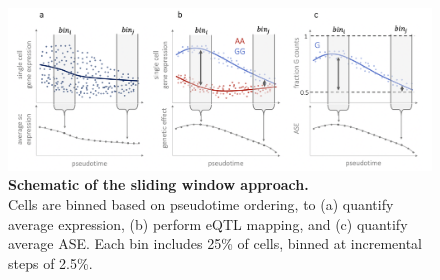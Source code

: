 \begin{figure}[h]
\centering
\includegraphics[width=15.5cm]{Chapter4/Fig/endodiff_running_average.png}
\caption[Schematic of the sliding window approach]{\textbf{Schematic of the sliding window approach.}\\
Cells are binned based on pseudotime ordering, to (a) quantify average expression, (b) perform eQTL mapping, and (c) quantify average ASE.
Each bin includes 25\% of cells, binned at incremental steps of 2.5\%.}
\label{fig:endodiff_sliding_window}
\end{figure}

